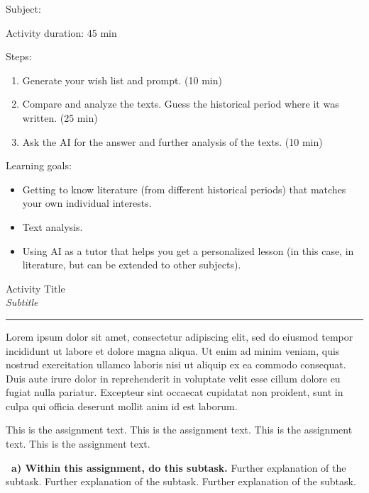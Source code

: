 \documentclass[12pt]{article}
\newcounter{exercise}
\newcommand{\exercisetitle}[2][]{%
  \refstepcounter{exercise}%
  \vspace{0.5cm}%
  \colorbox{maincolor}{%
    \makebox[\dimexpr\linewidth-2\fboxsep][l]{%
      \textcolor{white}{\faPen\ Assignment \theexercise:~ #2}%
    }%
  }%
  \if\relax\detokenize{#1}\relax\else\label{#1}\fi
  \vspace{0.3cm}%
}
\begin{document}
Subject: 

Activity duration: 45 min

\vspace{0.5cm}

Steps:
\begin{enumerate}
    \item Generate your wish list and prompt. (10 min)
    \item Compare and analyze the texts. Guess the historical period where it was written. (25 min)
    \item Ask the AI for the answer and further analysis of the texts. (10 min)
\end{enumerate}

Learning goals:

\begin{itemize}
    \item Getting to know literature (from different historical periods) that matches your own individual interests.
    \item Text analysis.
    \item Using AI as a tutor that helps you get a personalized lesson (in this case, in literature, but can be extended to other subjects).
\end{itemize}

\newpage

\begin{center}
    {\Huge \color{maincolor} Activity Title}\\[5pt]
    {\large \textit{Subtitle}}\\
    \rule{\linewidth}{1pt}
\end{center}

\vspace{0.5cm}

Lorem ipsum dolor sit amet, consectetur adipiscing elit, sed do eiusmod tempor incididunt ut labore et dolore magna aliqua. Ut enim ad minim veniam, quis nostrud exercitation ullamco laboris nisi ut aliquip ex ea commodo consequat. Duis aute irure dolor in reprehenderit in voluptate velit esse cillum dolore eu fugiat nulla pariatur. Excepteur sint occaecat cupidatat non proident, sunt in culpa qui officia deserunt mollit anim id est laborum.

\exercisetitle{}

This is the assignment text. This is the assignment text. This is the assignment text. This is the assignment text. 

\textcolor{maincolor}{\textbf{\faPen\ a) Within this assignment, do this subtask.}} Further explanation of the subtask. Further explanation of the subtask. Further explanation of the subtask.
\end{document}
